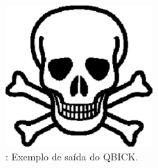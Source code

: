 \begin{figure}
	\includegraphics[width=0.5\textwidth]{figuras/test.pdf}
	\caption[Exemplo de saída do QBICK.]
	{\TODO: Exemplo de saída do QBICK.}
	\label{fig:QBICK}
\end{figure}

\subsection{\starlight}

